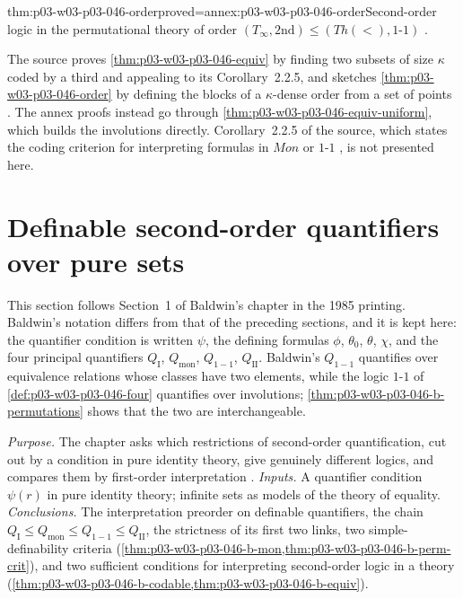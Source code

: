 \begin{hbcorollary}{thm:p03-w03-p03-046-order}{proved=annex:p03-w03-p03-046-order}{Second-order logic in the permutational theory of order}
\((T_\infty,\mathrm{2nd})\le(\mathit{Th}(<),\text{1-1})\)
\cite[p.~244, Corollary~2.2.7]{BaldwinShelah1985}.
\end{hbcorollary}

The source proves \cref{thm:p03-w03-p03-046-equiv} by finding two subsets
of size \(\kappa\) coded by a third and appealing to its
Corollary~2.2.5, and sketches \cref{thm:p03-w03-p03-046-order} by defining
the blocks of a \(\kappa\)-dense order from a set of points
\cite[p.~244]{BaldwinShelah1985}. The annex proofs instead go through
\cref{thm:p03-w03-p03-046-equiv-uniform}, which builds the involutions
directly. Corollary~2.2.5 of the source, which states the coding criterion
for interpreting formulas in \(\mathit{Mon}\) or \(\text{1-1}\)
\cite[p.~243]{BaldwinShelah1985}, is not presented here.

\section{Definable second-order quantifiers over pure sets}
\label{sec:p03-w03-p03-046-baldwin}

This section follows Section~1 of Baldwin's chapter
\cite[pp.~445--451]{Baldwin1985DSOQ} in the 1985 printing. Baldwin's
notation differs from that of the preceding sections, and it is kept here:
the quantifier condition is written \(\psi\), the defining formulas
\(\phi\), \(\theta_0\), \(\theta\), \(\chi\), and the four principal
quantifiers \(Q_{\mathrm I}\), \(Q_{\mathrm{mon}}\), \(Q_{1-1}\),
\(Q_{\mathrm{II}}\). Baldwin's \(Q_{1-1}\) quantifies over equivalence
relations whose classes have two elements, while the logic
\(\text{1-1}\) of \cref{def:p03-w03-p03-046-four} quantifies over
involutions; \cref{thm:p03-w03-p03-046-b-permutations} shows that the two
are interchangeable.

\emph{Purpose.} The chapter asks which restrictions of second-order
quantification, cut out by a condition in pure identity theory, give
genuinely different logics, and compares them by first-order
interpretation \cite[pp.~445--446]{Baldwin1985DSOQ}.
\emph{Inputs.} A quantifier condition \(\psi(r)\) in pure identity theory;
infinite sets as models of the theory of equality.
\emph{Conclusions.} The interpretation preorder on definable quantifiers,
the chain \(Q_{\mathrm I}\le Q_{\mathrm{mon}}\le Q_{1-1}\le Q_{\mathrm{II}}\),
the strictness of its first two links, two simple-definability criteria
(\cref{thm:p03-w03-p03-046-b-mon,thm:p03-w03-p03-046-b-perm-crit}), and two
sufficient conditions for interpreting second-order logic in a theory
(\cref{thm:p03-w03-p03-046-b-codable,thm:p03-w03-p03-046-b-equiv}).

